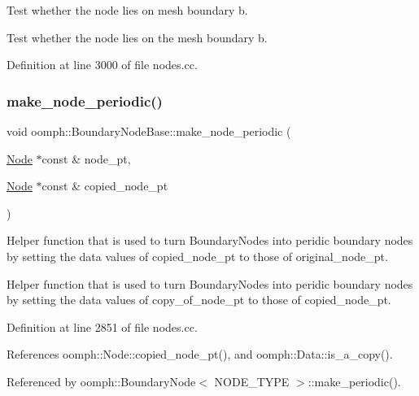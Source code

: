 Test whether the node lies on mesh boundary b. 

Test whether the node lies on the mesh boundary b. 

Definition at line 3000 of file nodes.\+cc.

\mbox{\label{classoomph_1_1BoundaryNodeBase_a335936260b9a5d6ed4e191e4c44ab3a2}} 
\subsubsection{\texorpdfstring{make\+\_\+node\+\_\+periodic()}{make\_node\_periodic()}}
{\footnotesize\ttfamily void oomph\+::\+Boundary\+Node\+Base\+::make\+\_\+node\+\_\+periodic (\begin{DoxyParamCaption}\item[{\hyperlink{classoomph_1_1Node}{Node} $\ast$const \&}]{node\+\_\+pt,  }\item[{\hyperlink{classoomph_1_1Node}{Node} $\ast$const \&}]{copied\+\_\+node\+\_\+pt }\end{DoxyParamCaption})\hspace{0.3cm}{\ttfamily [protected]}}



Helper function that is used to turn Boundary\+Nodes into peridic boundary nodes by setting the data values of copied\+\_\+node\+\_\+pt to those of original\+\_\+node\+\_\+pt. 

Helper function that is used to turn Boundary\+Nodes into peridic boundary nodes by setting the data values of copy\+\_\+of\+\_\+node\+\_\+pt to those of copied\+\_\+node\+\_\+pt. 

Definition at line 2851 of file nodes.\+cc.



References oomph\+::\+Node\+::copied\+\_\+node\+\_\+pt(), and oomph\+::\+Data\+::is\+\_\+a\+\_\+copy().



Referenced by oomph\+::\+Boundary\+Node$<$ N\+O\+D\+E\+\_\+\+T\+Y\+P\+E $>$\+::make\+\_\+periodic().

\mbox{\label{classoomph_1_1BoundaryNodeBase_aad627350ff61b7bfb86d6df80b8b9c77}} 
